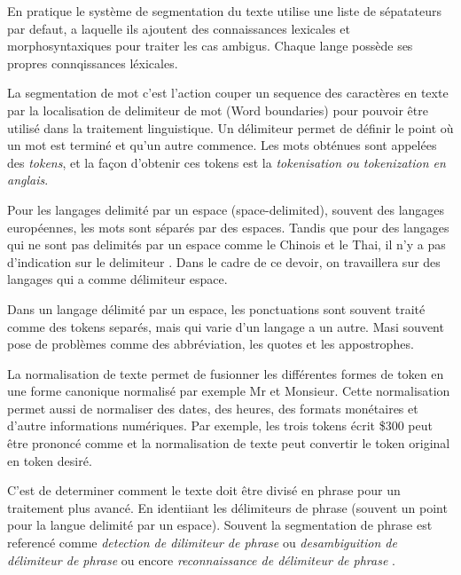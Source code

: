 En pratique le système de segmentation du texte utilise une liste de sépatateurs par defaut, a laquelle ils ajoutent des connaissances lexicales et morphosyntaxiques pour traiter les cas ambigus. Chaque lange possède ses propres connqissances léxicales.

La segmentation de mot c'est l'action couper un sequence des caractères en texte par la localisation de delimiteur de mot (Word boundaries) pour pouvoir être utilisé dans la traitement linguistique. Un délimiteur permet de définir le point où un mot est terminé et qu'un autre commence. Les mots obténues sont appelées des \textit{tokens}, et la façon d'obtenir ces tokens est la \textit{tokenisation ou tokenization en anglais}. \citep{handbook-nlp}

Pour les langages delimité par un espace (space-delimited), souvent des langages européennes, les mots sont séparés par des espaces. Tandis que pour des langages qui ne sont pas delimités par un espace comme le Chinois et le Thai, il n'y a pas d'indication sur le delimiteur \citep{handbook-nlp}. Dans le cadre de ce devoir, on travaillera sur des langages qui a comme délimiteur espace.

Dans un langage délimité par un espace, les ponctuations sont souvent traité comme des tokens separés, mais qui varie d'un langage a un autre. Masi souvent pose de problèmes comme des abbréviation, les quotes et les appostrophes. \citep{handbook-nlp}

La normalisation de texte permet de fusionner les différentes formes de token en une forme canonique normalisé par exemple Mr et Monsieur. Cette normalisation permet aussi de normaliser des dates, des heures, des formats monétaires et d'autre informations numériques. Par exemple, les trois tokens écrit \$300 peut être prononcé comme  \fg{} et la normalisation de texte peut convertir le token original en token desiré. \citep{handbook-nlp}

C'est de determiner comment le texte doit être divisé en phrase pour un traitement plus avancé. En identiiant les délimiteurs de phrase (souvent un point pour la langue delimité par un espace). Souvent la segmentation de phrase est referencé comme \textit{detection de dilimiteur de phrase} ou \textit{desambiguition de délimiteur de phrase} ou encore \textit{reconnaissance de délimiteur de phrase} \citep{handbook-nlp}.


